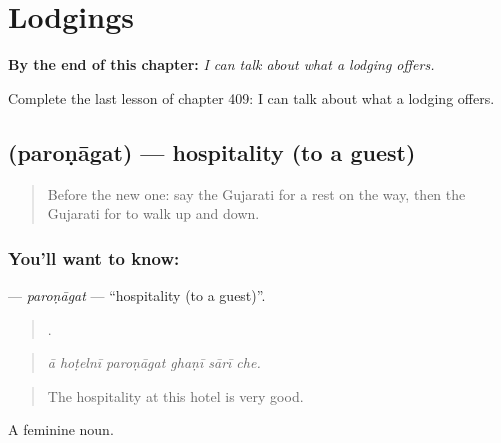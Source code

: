 
\chapter{Lodgings}
\label{ch:gu-lodgings}

\begin{chapteropening}
\textbf{By the end of this chapter:} \emph{I can talk about what a lodging offers.}

Complete the last lesson of chapter 409: I can talk about what a lodging offers.
\end{chapteropening}

\section[\texorpdfstring{\gu{પરોણાગત} (paroṇāgat)}{પરોણાગત (paroṇāgat)}]{ (paroṇāgat) — hospitality (to a guest)}

\label{lesson:GU-C409-paronagat}



\begin{quote}
Before the new one: say the Gujarati for a rest on the way, then the Gujarati for to walk up and down.
\end{quote}

\subsection*{You'll want to know: }
\textbf{} — \emph{paroṇāgat} — \textquotedblleft{}hospitality (to a guest)\textquotedblright{}.

\begin{quote}
     .
\end{quote}

\begin{quote}
\emph{ā hoṭelnī paroṇāgat ghaṇī sārī che.}
\end{quote}

\begin{quote}
The hospitality at this hotel is very good.
\end{quote}

A feminine noun.

